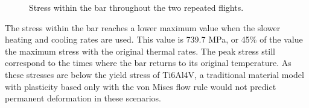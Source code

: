 \documentclass[conf]{new-aiaa}
\begin{document}
\begin{figure}[H]
  \centering
  \caption{ Stress within the bar throughout the two repeated flights.}
  \label{fig_slow_full_bar_stress}
\end{figure}


The stress within the bar reaches a lower maximum value 
when the slower heating and cooling rates are used.
This value is 739.7 MPa, or 45\% of the value
the maximum stress with the original thermal rates.
The peak stress still correspond to the times where
the bar returns to its original temperature.
As these stresses are below the yield stress of Ti6Al4V, 
a traditional material model with plasticity based only with the
von Mises flow rule would not predict permanent deformation 
in these scenarios.
\end{document}
